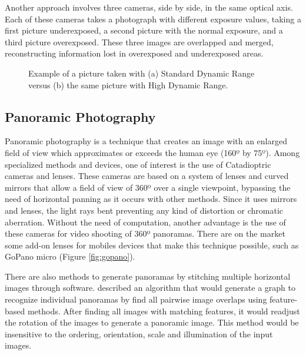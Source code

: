 Another approach \cite{vavilin2011fast} involves three cameras, side by side, in the same optical axis.%
Each of these cameras takes a photograph with different exposure values, taking a first picture underexposed, a second picture with the normal exposure, and a third picture overexposed. These three images are overlapped and merged, reconstructing information lost in overexposed and underexposed areas.

\begin{figure}[htbp]
        \centering
  \caption{Example of a picture taken with (a) Standard Dynamic Range versus (b) the same picture with High Dynamic Range.}
  \label{fig:hdr_example}
\end{figure}


\subsection{Panoramic Photography}

Panoramic photography is a technique that creates an image with an enlarged field of view which approximates or exceeds the human eye (160º by 75º). Among specialized methods and devices, one of interest is the use of Catadioptric cameras and lenses. These cameras are based on a system of lenses and curved mirrors that allow a field of view of 360º over a single viewpoint, bypassing the need of horizontal panning as it occurs with other methods. Since it uses mirrors and lenses, the light rays bent preventing any kind of distortion or chromatic aberration. Without the need of computation, another advantage is the use of these cameras for video shooting of 360º panoramas. 
There are on the market some add-on lenses for mobiles devices that make this technique possible, such as GoPano micro (Figure \ref{fig:gopano}).

There are also methods to generate panoramas by stitching multiple horizontal images through software.
\citeauthor{brown2007automatic} \cite{brown2007automatic} described an algorithm that would generate a graph to recognize individual panoramas by find all pairwise image overlaps using feature-based methods. After finding all images with matching features, it would readjust the rotation of the images to generate a panoramic image. This method would be insensitive to the ordering, orientation, scale and illumination of the input images.

